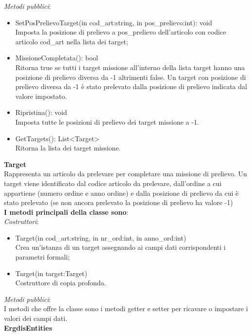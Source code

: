 \textit{Metodi pubblici}:\\
\begin{itemize}
    \item SetPosPrelievoTarget(in cod\_art:string, in pos\_prelievo:int): void\\
    Imposta la posizione di prelievo a pos\_prelievo dell'articolo con codice articolo cod\_art nella lista dei target;
    \item MissioneCompletata(): bool\\
    Ritorna true se tutti i target missione all'interno della lista target hanno una posizione di prelievo diversa da -1 altrimenti false.
    Un target con posizione di prelievo diversa da -1 è stato prelevato dalla posizione di prelievo indicata dal valore impostato.
    \item Ripristina(): void\\
    Imposta tutte le posizioni di prelievo dei target missione a -1.
    \item GetTargets(): List<Target>\\
    Ritorna la lista dei target missione.\\
\end{itemize} 
\textbf{Target}\\
Rappresenta un articolo da prelevare per completare una missione di prelievo.
Un target viene identificato dal codice articolo da prelevare, dall'ordine a cui appartiene (numero ordine e anno ordine) e dalla posizione
di prelievo da cui è stato prelevato (se non ancora prelevato la posizione di prelievo ha valore -1)\\
\textbf{I metodi principali della classe sono}:\\
\textit{Costruttori}:\\
\begin{itemize}
    \item Target(in cod\_art:string, in nr\_ord:int, in anno\_ord:int)\\
    Crea un'istanza di un target assegnando ai campi dati corrispondenti i parametri formali;
    \item Target(in target:Target)\\
    Costruttore di copia profonda.\\
\end{itemize}
\textit{Metodi pubblici}:\\
I metodi che offre la classe sono i metodi getter e setter per ricavare o impostare i valori dei campi dati.\\
\textbf{ErgdisEntities}\\
